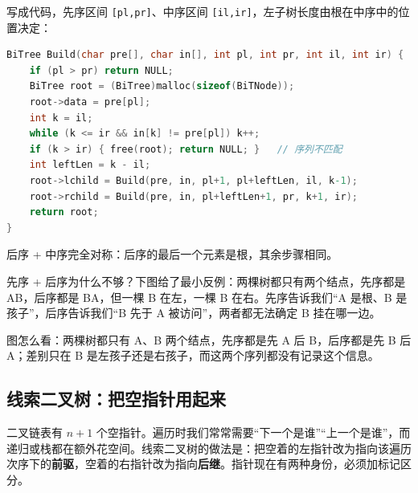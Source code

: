 写成代码，先序区间 \texttt{[pl,pr]}、中序区间 \texttt{[il,ir]}，左子树长度由根在中序中的位置决定：

\begin{lstlisting}[language=C]
BiTree Build(char pre[], char in[], int pl, int pr, int il, int ir) {
    if (pl > pr) return NULL;
    BiTree root = (BiTree)malloc(sizeof(BiTNode));
    root->data = pre[pl];
    int k = il;
    while (k <= ir && in[k] != pre[pl]) k++;
    if (k > ir) { free(root); return NULL; }   // 序列不匹配
    int leftLen = k - il;
    root->lchild = Build(pre, in, pl+1, pl+leftLen, il, k-1);
    root->rchild = Build(pre, in, pl+leftLen+1, pr, k+1, ir);
    return root;
}
\end{lstlisting}

后序 + 中序完全对称：后序的最后一个元素是根，其余步骤相同。

先序 + 后序为什么不够？下图给了最小反例：两棵树都只有两个结点，先序都是 AB，后序都是 BA，但一棵 B 在左，一棵 B 在右。先序告诉我们“A 是根、B 是孩子”，后序告诉我们“B 先于 A 被访问”，两者都无法确定 B 挂在哪一边。

\begin{center}
\end{center}

\smallskip
{\footnotesize\color{MutedText}图怎么看：两棵树都只有 A、B 两个结点，先序都是先 A 后 B，后序都是先 B 后 A；差别只在 B 是左孩子还是右孩子，而这两个序列都没有记录这个信息。}

\subsection{线索二叉树：把空指针用起来}

二叉链表有 $n+1$ 个空指针。遍历时我们常常需要“下一个是谁”“上一个是谁”，而递归或栈都在额外花空间。线索二叉树的做法是：把空着的左指针改为指向该遍历次序下的\textbf{前驱}，空着的右指针改为指向\textbf{后继}。指针现在有两种身份，必须加标记区分。

